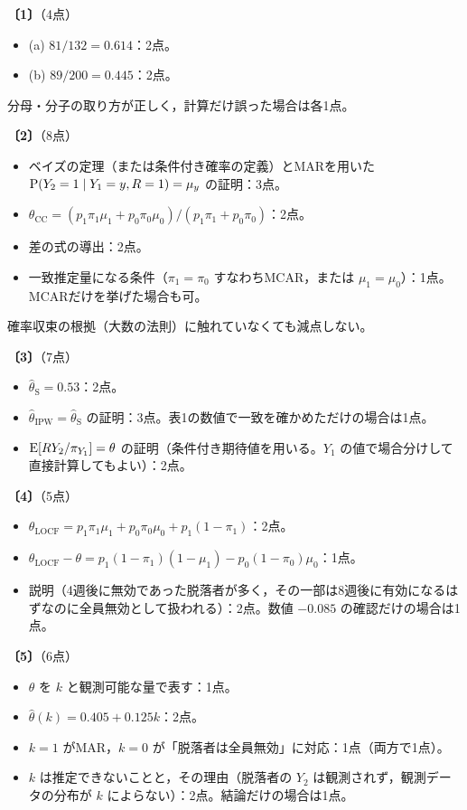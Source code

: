\documentclass[a4paper,11pt]{ltjsarticle}
\renewcommand{\ans}[1]{\par\medskip\noindent\textbf{〔#1〕}\quad}
\renewcommand{\points}[1]{\hfill\textnormal{（#1点）}\par\nobreak}
\begin{document}
\ans{1}\points{4}
\begin{itemize}
\item (a) $81/132=0.614$：2点。
\item (b) $89/200=0.445$：2点。
\end{itemize}
分母・分子の取り方が正しく，計算だけ誤った場合は各1点。

\ans{2}\points{8}
\begin{itemize}
\item ベイズの定理（または条件付き確率の定義）とMARを用いた $\operatorname{P}(Y_2=1\mid Y_1=y,R=1)=\mu_y$ の証明：3点。
\item $\theta_{\mathrm{CC}}=(p_1\pi_1\mu_1+p_0\pi_0\mu_0)/(p_1\pi_1+p_0\pi_0)$：2点。
\item 差の式の導出：2点。
\item 一致推定量になる条件（$\pi_1=\pi_0$ すなわちMCAR，または $\mu_1=\mu_0$）：1点。MCARだけを挙げた場合も可。
\end{itemize}
確率収束の根拠（大数の法則）に触れていなくても減点しない。

\ans{3}\points{7}
\begin{itemize}
\item $\hat\theta_{\mathrm S}=0.53$：2点。
\item $\hat\theta_{\mathrm{IPW}}=\hat\theta_{\mathrm S}$ の証明：3点。表1の数値で一致を確かめただけの場合は1点。
\item $\operatorname{E}[RY_2/\pi_{Y_1}]=\theta$ の証明（条件付き期待値を用いる。$Y_1$ の値で場合分けして直接計算してもよい）：2点。
\end{itemize}

\ans{4}\points{5}
\begin{itemize}
\item $\theta_{\mathrm{LOCF}}=p_1\pi_1\mu_1+p_0\pi_0\mu_0+p_1(1-\pi_1)$：2点。
\item $\theta_{\mathrm{LOCF}}-\theta=p_1(1-\pi_1)(1-\mu_1)-p_0(1-\pi_0)\mu_0$：1点。
\item 説明（4週後に無効であった脱落者が多く，その一部は8週後に有効になるはずなのに全員無効として扱われる）：2点。数値 $-0.085$ の確認だけの場合は1点。
\end{itemize}

\ans{5}\points{6}
\begin{itemize}
\item $\theta$ を $k$ と観測可能な量で表す：1点。
\item $\hat\theta(k)=0.405+0.125k$：2点。
\item $k=1$ がMAR，$k=0$ が「脱落者は全員無効」に対応：1点（両方で1点）。
\item $k$ は推定できないことと，その理由（脱落者の $Y_2$ は観測されず，観測データの分布が $k$ によらない）：2点。結論だけの場合は1点。
\end{itemize}
\newpage
\end{document}
